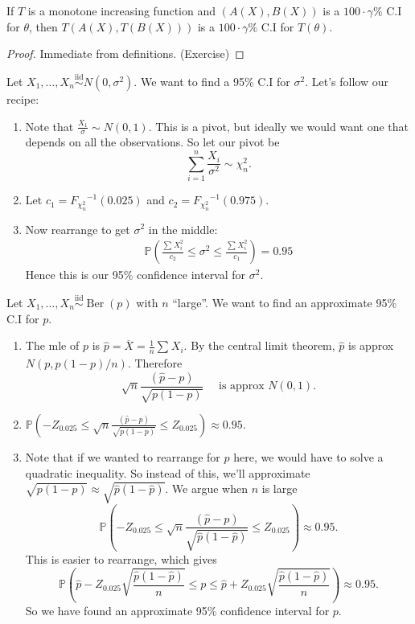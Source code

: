 \documentclass[egregdoesnotlikesansseriftitles,a4paper]{scrartcl}
\begin{document}
\begin{proposition}
      If $T$ is a monotone increasing function and $(A (X),B (X))$ is a $100 \cdot \gamma \%$ C.I for $\theta$, then $T (A (X),T (B (X)))$ is a $100 \cdot \gamma \%$ C.I for $T (\theta)$.
\end{proposition}
\begin{proof}
      Immediate from definitions. (Exercise)
\end{proof}
\begin{example*}
      Let $X_1 , \ldots, X_n \overset{\operatorname{iid}}{\sim} N (0,\sigma^{2} )$. We want to find a 95\% C.I for $\sigma^2$. Let's follow our recipe:
      \begin{enumerate}
           \item Note that $ \frac{X_1 }{\sigma}\sim N (0,1)$. This is a pivot, but ideally we would want one that depends on all the observations. So let our pivot be \[
               \sum_{i=1}^{n} \frac{X_{i}}{\sigma^2} \sim \chi_{n}^2
           .\] 
           \item Let $c_1 = {F_{\chi_{n}^2}}^{-1} (0.025) $ and $c_2 ={F_{\chi_{n}^2}}^{-1}(0.975)$.
           \item Now rearrange to get $\sigma^{2}$ in the middle: 
           \begin{align*}
                \mathbb{P}( \frac{\sum_{}^{}X_i^2}{c_2 }\leq \sigma^2 \leq \frac{\sum_{}^{}X_i^2}{c_1 })=0.95
           \end{align*}
           Hence this is our 95\% confidence interval for $\sigma^{2}$.
      \end{enumerate}
\end{example*}
\begin{example*}
      Let $X_1 , \ldots, X_n \overset{\operatorname{iid}}{\sim} \operatorname{Ber} (p)$ with $n$ ``large''. We want to find an approximate 95\% C.I for $p$.
     \begin{enumerate}
          \item The mle of $p$ is $\hat{p}=\overline{X}=\frac{1}{n}\sum_{}^{}X_{i}$. By the central limit theorem, $\hat{p}$ is approx $N (p,p (1-p)/n)$. Therefore \[
          \sqrt{n} \frac{(\hat{p}-p)}{\sqrt{p (1-p)}} \quad \text{ is approx } N (0,1)
          .\] 
          \item $\mathbb{P} (-Z_{0.025} \leq \sqrt{n}\frac{(\hat{p}-p)}{\sqrt{p (1-p)}} \leq Z_{0.025})\approx 0.95$.
          \item Note that if we wanted to rearrange for $p$ here, we would have to solve a quadratic inequality. So instead of this, we'll approximate $\sqrt{p (1-p)} \approx \sqrt{\hat{p} (1-\hat{p})}$. We argue when $n$ is large \[
               \mathbb{P} (-Z_{0.025} \leq \sqrt{n}\frac{(\hat{p}-p)}{\sqrt{\hat{p} (1-\hat{p})}} \leq Z_{0.025})\approx 0.95
          .\] This is easier to rearrange, which gives \[
          \mathbb{P} (\hat{p}-Z_{0.025} \sqrt{ \frac{\hat{p} (1-\hat{p})}{n}}\leq p \leq \hat{p}+Z_{0.025} \sqrt{ \frac{\hat{p} (1-\hat{p})}{n}})\approx 0.95
          .\] So we have found an approximate 95\% confidence interval for $p$.
     \end{enumerate}
\end{example*}
\end{document}
